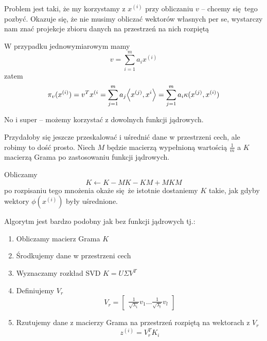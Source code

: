 Problem jest taki, że my korzystamy z \( x^{(i)} \) przy obliczaniu \( v \) -- chcemy się tego pozbyć.
Okazuje się, że nie musimy obliczać wektorów własnych per se, wystarczy nam znać projekcje zbioru danych na przestrzeń na nich rozpiętą

W przypadku jednowymiarowym mamy
\[
    v = \sum_{i=1}^m a_i x^{(i)}
\]
zatem
\[
    \pi_v(x^{(i)}) = v^Tx^{(i} = \sum_{j=1}^m a_j\dotproduct{x^{(j)}, x^{i}} =
    \sum_{j=1}^m a_i \kappa(x^{(j)}, x^{(i)})
\]

No i super -- możemy korzystać z dowolnych funkcji jądrowych.

Przydałoby się jeszcze przeskalować i uśrednić dane w przestrzeni cech, ale robimy to dość prosto.
Niech \( M \) będzie macierzą wypełnioną wartością \( \frac{1}{m} \) a \( K \) macierzą Grama po zastosowaniu funkcji jądrowych.

Obliczamy
\[
    K \leftarrow K - MK - KM + MKM
\]
po rozpisaniu tego mnożenia okaże się że istotnie dostaniemy \( K \) takie, jak gdyby wektory \( \phi(x^{(i)}) \) były uśrednione.

Algorytm jest bardzo podobny jak bez funkcji jądrowych tj.:
\begin{enumerate}
    \item Obliczamy macierz Grama \( K \)
    \item Środkujemy dane w przestrzeni cech
    \item Wyznaczamy rozkład SVD \( K = U\Sigma V^T \)
    \item Definiujemy \( V_r \)
    \[
        V_r = \begin{bmatrix}
        \frac{1}{\sqrt{\lambda_1}} v_1 \hdots \frac{1}{\sqrt{\lambda_l}} v_l
        \end{bmatrix}
    \]
    \item Rzutujemy dane z macierzy Grama na przestrzeń rozpiętą na wektorach z \( V_r \)
    \[
        z^{(i)} = V_r^T K_i
    \]
\end{enumerate}